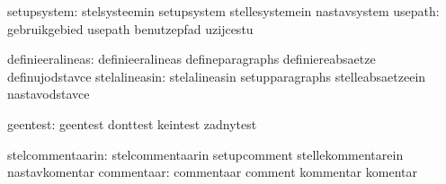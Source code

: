                   setupsystem:  stelsysteemin                setupsystem
                                stellesystemein              nastavsystem
                      usepath:  gebruikgebied                usepath 
                                benutzepfad                  uzijcestu

             definieeralineas:  definieeralineas             defineparagraphs
                                definiereabsaetze            definujodstavce
                stelalineasin:  stelalineasin                setupparagraphs
                                stelleabsaetzeein            nastavodstavce

                     geentest:  geentest                     donttest
                                keintest                     zadnytest

             stelcommentaarin:  stelcommentaarin             setupcomment
                                stellekommentarein           nastavkomentar
                   commentaar:  commentaar                   comment
                                kommentar                    komentar

